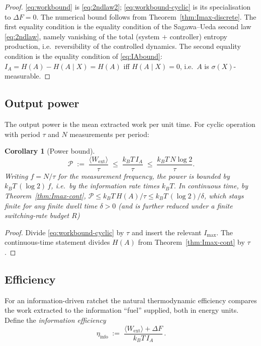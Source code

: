 \documentclass{amsart}
\newtheorem{corollary}{Corollary}
\theoremstyle{definition}
\newcommand{\kB}{k_{B}}
\newcommand{\Wext}{\langle W_{\mathrm{ext}}\rangle}
\begin{document}
\begin{proof}
\eqref{eq:workbound} is \eqref{eq:2ndlaw2}; \eqref{eq:workbound-cyclic} is its
specialisation to $\Delta F=0$. The numerical bound follows from
Theorem~\ref{thm:Imax-discrete}. The first equality condition is the
equality condition of the Sagawa--Ueda second law \eqref{eq:2ndlaw}, namely
vanishing of the total (system $+$ controller) entropy production, i.e.\
reversibility of the controlled dynamics. The second equality condition is the
equality condition of \eqref{eq:IAbound}: $I_A=H(A)-H(A\mid X)=H(A)$ iff
$H(A\mid X)=0$, i.e.\ $A$ is $\sigma(X)$-measurable.
\end{proof}

\subsection{Output power}

The output power is the mean extracted work per unit time. For cyclic
operation with period $\tau$ and $N$ measurements per period:

\begin{corollary}[Power bound]\label{cor:power}
\begin{equation}\label{eq:power}
\mathcal P \;:=\; \frac{\Wext}{\tau}\;\le\;\frac{\kB T\,I_A}{\tau}
\;\le\;\frac{\kB T\,N\log2}{\tau}.
\end{equation}
Writing $f=N/\tau$ for the measurement frequency, the power is bounded by
$\kB T\,(\log2)\,f$, i.e.\ by the information \emph{rate} times $\kB T$. In
continuous time, by Theorem~\ref{thm:Imax-cont},
$\mathcal P\le \kB T\,H(A)/\tau\le \kB T\,(\log2)/\delta$, which stays
finite for any finite dwell time $\delta>0$ (and is further reduced under a
finite switching-rate budget $R$)
\end{corollary}

\begin{proof}
Divide \eqref{eq:workbound-cyclic} by $\tau$ and insert the relevant
$I_{\max}$. The continuous-time statement divides $H(A)$ from
Theorem~\ref{thm:Imax-cont} by $\tau$.
\end{proof}

\subsection{Efficiency}

For an information-driven ratchet the natural thermodynamic efficiency
compares the work extracted to the information ``fuel'' supplied, both in
energy units. Define the \emph{information efficiency}
\begin{equation}\label{eq:eta-def}
\eta_{\mathrm{info}} \;:=\; \frac{\Wext + \Delta F}{\kB T\, I_A}\, .
\end{equation}
\end{document}
